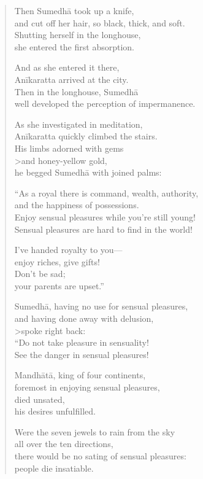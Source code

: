 \documentclass[12pt,openany]{book}%
\begin{document}
\begin{verse}
Then \textsanskrit{Sumedhā} took up a knife, \\
and cut off her hair, so black, thick, and soft. \\
Shutting herself in the longhouse, \\
she entered the first absorption. 

And as she entered it there, \\
\textsanskrit{Anīkaratta} arrived at the city. \\
Then in the longhouse, \textsanskrit{Sumedhā} \\
well developed the perception of impermanence. 

As she investigated in meditation, \\
\textsanskrit{Anīkaratta} quickly climbed the stairs. \\
His limbs adorned with gems \\>and honey-yellow gold, \\
he begged \textsanskrit{Sumedhā} with joined palms: 

“As a royal there is command, wealth, authority, \\
and the happiness of possessions. \\
Enjoy sensual pleasures while you’re still young! \\
Sensual pleasures are hard to find in the world! 

I’ve handed royalty to you—\\
enjoy riches, give gifts! \\
Don’t be sad; \\
your parents are upset.” 

\textsanskrit{Sumedhā}, having no use for sensual pleasures, \\
and having done away with delusion, \\>spoke right back: \\
“Do not take pleasure in sensuality! \\
See the danger in sensual pleasures! 

\textsanskrit{Mandhātā}, king of four continents, \\
foremost in enjoying sensual pleasures, \\
died unsated, \\
his desires unfulfilled. 

Were the seven jewels to rain from the sky \\
all over the ten directions, \\
there would be no sating of sensual pleasures: \\
people die insatiable. 


\end{verse}
\end{document}
